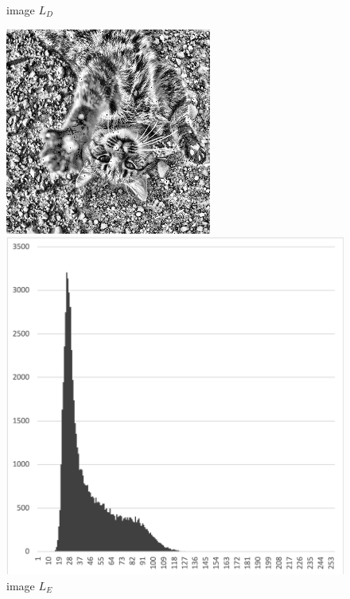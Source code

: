 \documentclass[12pt,a4paper,notitlepage,oneside,amsmath,amssymb]{article}
\begin{document}
\begin{CJK*}{UTF8}{bkai}
\begin{enumerate}[label=(\alph*)]
\begin{figure}[hbt!]
\begin{minipage}{.25\textwidth}
              \caption*{image \(L_D\)}
            \end{minipage}%
            \begin{minipage}{.25\textwidth}
              \centering
              \includegraphics[width=.95\linewidth]{image_LE}
              \caption*{image \(L_E\)}
            \end{minipage}
            \begin{minipage}{.25\textwidth}
              \centering
              \includegraphics[width=.95\linewidth]{hist_D}

\end{minipage}
\end{figure}
\end{enumerate}
\end{CJK*}
\end{document}
